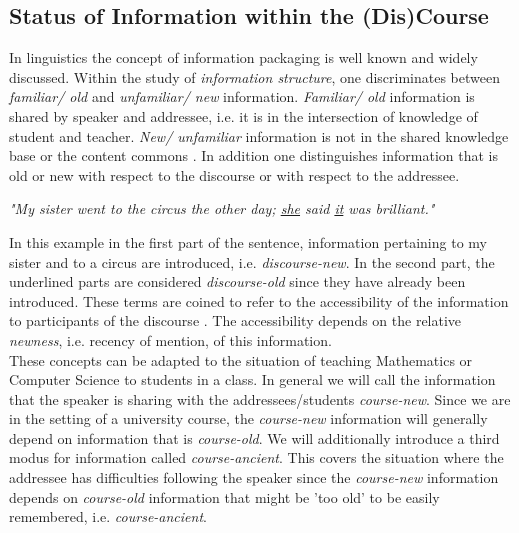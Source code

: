 \documentclass[twoside, 12pt]{article}
\begin{document}

\subsection{Status of Information within the (Dis)Course}
\label{sec:infostatus}

In linguistics the concept of information packaging \cite{CambridgeGrammar:npentrel14} is well known and widely discussed. Within the study of \textit{information structure}, one discriminates between \textit{familiar/ old} and \textit{unfamiliar/ new} information. \textit{Familiar/ old} information is shared by speaker and addressee, i.e. it is in the intersection of knowledge of student and teacher. \textit{New/ unfamiliar} information is not in the shared knowledge base or the content commons \cite{CNX:whitepaper}. In addition one distinguishes information that is old or new with respect to the discourse or with respect to the addressee.

\begin{center}
\textit{"My sister went to the circus the other day; \underline{she} said \underline{it} was brilliant."}\\
\end{center}

In this example in the first part of the sentence, information pertaining to my sister and to a circus are introduced, i.e. \textit{discourse-new}. In the second part, the underlined parts are considered \textit{discourse-old} since they have already been introduced. These terms are coined to refer to the accessibility of the information to participants of the discourse \cite{Newness:npentrel14}. The accessibility depends on the relative \textit{newness}, i.e. recency of mention, of this information.\\

These concepts can be adapted to the situation of teaching Mathematics or Computer Science to students in a class. In general we will call the information that the speaker is sharing with the addressees/students \textit{course-new}. Since we are in the setting of a university course, the \textit{course-new} information will generally depend on information that is \textit{course-old}. We will additionally introduce a third modus for information called \textit{course-ancient}. This covers the situation where the addressee has difficulties following the speaker since the \textit{course-new} information depends on \textit{course-old} information that might be 'too old' to be easily remembered, i.e. \textit{course-ancient}.\\
\end{document}
